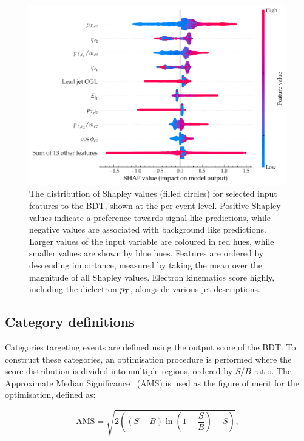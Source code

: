 \begin{figure}[htbp!] 
\centering 
\includegraphics[width =0.8\linewidth]{Figures/Hee/ggH/featureImportances/shapley_beeswarm_ggH_BDT_featureSelection.pdf}
\caption[The feature importance for selected inputs to the \ggH BDT.]{The distribution of Shapley values (filled circles) for selected input features to the \ggH BDT, shown at the per-event level. Positive Shapley values indicate a preference towards signal-like predictions, while negative values are associated with background like predictions. Larger values of the input variable are coloured in red hues, while smaller values are shown by blue hues. Features are ordered by descending importance, measured by taking the mean over the magnitude of all Shapley values. Electron kinematics score highly, including the dielectron $p_T$, alongside various jet descriptions.}
\label{fig:ggh_shap_values}
\end{figure}

\subsection{Category definitions}

Categories targeting \ggH events are defined using the output score of the \ggH BDT. To construct these categories, an optimisation procedure is performed where the score distribution is divided into multiple regions, ordered by $S/B$ ratio. The Approximate Median Significance~\cite{Cowan} (AMS) is used as the figure of merit for the optimisation, defined as:

\begin{equation}
    \mathrm{AMS} = \sqrt{2\left( (S+B)\ln\left(1+\frac{S}{B}\right)-S\right)},
\end{equation}

